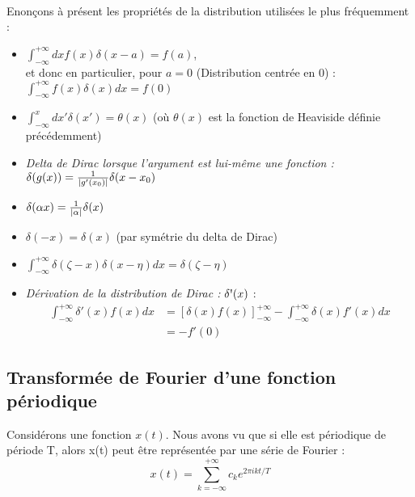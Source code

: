 \documentclass[../notesdecours.tex]{subfiles}
\begin{document}
\paragraph{} Enonçons à présent les propriétés de la distribution utilisées le plus fréquemment :
\begin{itemize}[label = \textbullet]
    \item $\int_{-\infty}^{+\infty} dx f(x)\delta(x-a) = f(a)$, \\
    et donc en particulier, pour $a = 0$ (Distribution centrée en 0) :  $\int_{-\infty}^{+\infty} f(x)\delta(x) dx = f(0)$
    \item $\int_{-\infty}^{x} dx' \delta(x') = \theta(x)$ (où $\theta (x)$ est la fonction de Heaviside définie précédemment)
    \item \textit{Delta de Dirac lorsque l'argument est lui-même une fonction : }$\delta(g(x)) = \frac{1}{\abs{g'(x_0)}}\delta(x-x_0)$ %
    \item $\delta(\alpha x) = \frac{1}{\abs{\alpha}}\delta(x)$
    \item $\delta(-x) = \delta(x)$ (par symétrie du delta de Dirac)
    \item $\int_{-\infty}^{+\infty} \delta(\zeta - x)\delta(x- \eta) dx = \delta (\zeta - \eta)$
    \item \textit{Dérivation de la distribution de Dirac : } $\delta \mbox{\textquotesingle} (x)$ : 
    \begin{align}
        \int^{+\infty}_{-\infty} \delta '(x)f(x) dx &= \left[ \delta(x)f(x) \right]_{-\infty}^{+\infty} - \int_{-\infty}^{+\infty} \delta(x)f'(x) dx \\
    &= -f'(0)
    \end{align}
\end{itemize}

\subsection{Transformée de Fourier d'une fonction périodique}
Considérons une fonction $x(t)$. Nous avons vu que si elle est périodique de période T, alors x(t) peut être représentée par une série de Fourier : 
\begin{equation}
\label{serie de Fourier de x}
    x(t) = \sum_{k = -\infty}^{+\infty} c_ke^{2 \pi i k t/T}
\end{equation}
\end{document}
